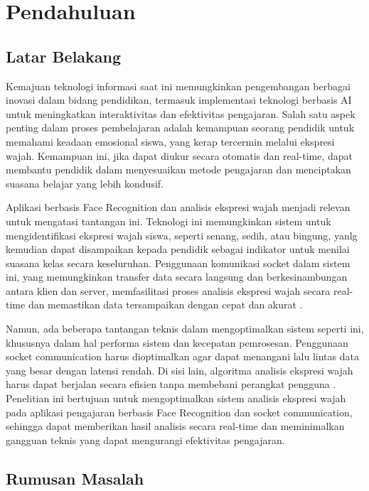 \chapter{Pendahuluan}
\section{Latar Belakang}
\qquad Kemajuan teknologi informasi saat ini memungkinkan pengembangan berbagai inovasi dalam bidang pendidikan, termasuk implementasi teknologi berbasis AI untuk meningkatkan interaktivitas dan efektivitas pengajaran. Salah satu aspek penting dalam proses pembelajaran adalah kemampuan seorang pendidik untuk memahami keadaan emosional siswa, yang kerap tercermin melalui ekspresi wajah. Kemampuan ini, jika dapat diukur secara otomatis dan real-time, dapat membantu pendidik dalam menyesuaikan metode pengajaran dan menciptakan suasana belajar yang lebih kondusif.

Aplikasi berbasis Face Recognition dan analisis ekspresi wajah menjadi relevan untuk mengatasi tantangan ini. Teknologi ini memungkinkan sistem untuk mengidentifikasi ekspresi wajah siswa, seperti senang, sedih, atau bingung, yanlg kemudian dapat disampaikan kepada pendidik sebagai indikator untuk menilai suasana kelas secara keseluruhan. Penggunaan komunikasi socket dalam sistem ini, yang memungkinkan transfer data secara langsung dan berkesinambungan antara klien dan server, memfasilitasi proses analisis ekspresi wajah secara real-time dan memastikan data tersampaikan dengan cepat dan akurat \parencite{ogundeyiWebSocketRealTime2019}.

Namun, ada beberapa tantangan teknis dalam mengoptimalkan sistem seperti ini, khususnya dalam hal performa sistem dan kecepatan pemrosesan. Penggunaan socket communication harus dioptimalkan agar dapat menangani lalu lintas data yang besar dengan latensi rendah. Di sisi lain, algoritma analisis ekspresi wajah harus dapat berjalan secara efisien tanpa membebani perangkat pengguna \parencite{phankokkruadRealtimeFaceRecognition2016a}. Penelitian ini bertujuan untuk mengoptimalkan sistem analisis ekspresi wajah pada aplikasi pengajaran berbasis Face Recognition dan socket communication, sehingga dapat memberikan hasil analisis secara real-time dan meminimalkan gangguan teknis yang dapat mengurangi efektivitas pengajaran.

\section{Rumusan Masalah}

